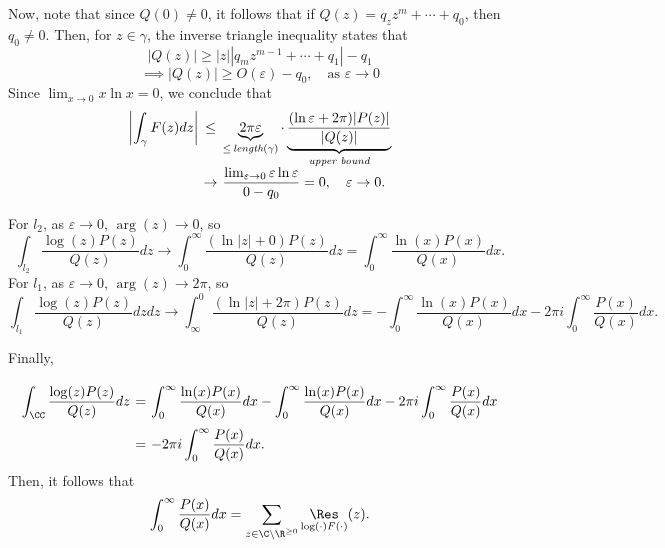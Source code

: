 Now, note that since $Q(0) \neq 0$, it follows that if $Q(z) = q_z z^m + \cdots + q_0$, then $q_0 \neq 0$. Then, for $z\in \gamma$, the inverse triangle inequality states that
\[ |Q(z)| \geq |z||q_m z^{m-1} + \cdots + q_1| - q_1 \]
\[ \implies |Q(z)| \geq O(\varepsilon) - q_0,\hspace{1em} \mbox{as $\varepsilon \to 0$} \]
Since $\lim_{x\to 0} x \ln x = 0$, we conclude that 
\[ \everymath{\displaystyle}
\arraycolsep=1.8pt\def\arraystretch{1.5}
\begin{array}{rcl}
    \left| \int_{\gamma} F(z) dz \right| & \leq & \underbrace{2\pi \varepsilon}_{\leq\,\textit{length}(\gamma)} \cdot \underbrace{\frac{(\ln \varepsilon + 2\pi)|P(z)|}{|Q(z)|}}_{\textit{upper bound}}\\
    & \to & \frac{\lim_{\varepsilon \to 0}\varepsilon \ln \varepsilon}{0 - q_0} = 0,\hspace{1em} \varepsilon \to 0.
\end{array} \]

For $l_2$, as $\varepsilon \to 0$, $\arg(z) \to 0$, so
\[ \int_{l_2} \frac{\log(z) P(z)}{Q(z)} dz \to \int_{0}^{\infty} \frac{(\ln|z| + 0)P(z)}{Q(z)} dz = \int_{0}^{\infty} \frac{\ln(x) P(x)}{Q(x)} dx. \]
For $l_1$, as $\varepsilon \to 0$, $\arg(z) \to 2\pi$, so
\[ \int_{l_1} \frac{\log(z) P(z)}{Q(z)} dz  dz \to \int_{\infty}^{0} \frac{(\ln|z| + 2\pi)P(z)}{Q(z)} dz = -\int_{0}^{\infty} \frac{\ln(x) P(x)}{Q(x)} dx - 2\pi i \int_{0}^{\infty}\frac{P(x)}{Q(x)} dx. \]

Finally,
\[ \everymath{\displaystyle}
\arraycolsep=1.8pt\def\arraystretch{2.5}
\begin{array}{rcl}
    \int_{\CC} \frac{\log(z) P(z)}{Q(z)} dz  & = & \int_{0}^{\infty} \frac{\ln(x) P(x)}{Q(x)} dx-\int_{0}^{\infty} \frac{\ln(x) P(x)}{Q(x)} dx - 2\pi i \int_{0}^{\infty}\frac{P(x)}{Q(x)} dx\\
    & = &  - 2\pi i \int_{0}^{\infty}\frac{P(x)}{Q(x)} dx.
\end{array} \]
Then, it follows that
\[ \int_{0}^{\infty}\frac{P(x)}{Q(x)} dx = \sum_{z \in \C\backslash \R^{\geq 0}}\underset{{\log(\cdot)F(\cdot)}}{\Res}(z). \]